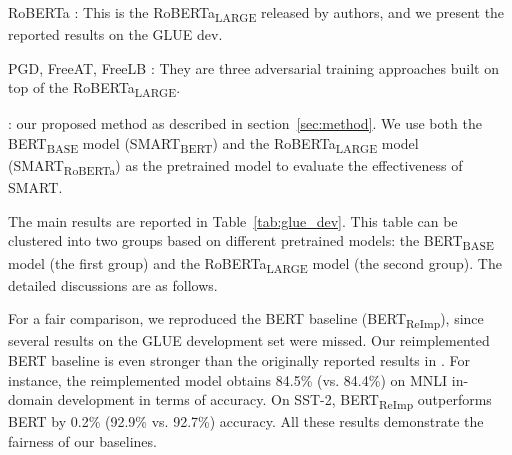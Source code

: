 \documentclass[11pt]{article} \usepackage{url}
\newcommand\model{SMART}
\begin{document}
\vskip1pt
\noindent  RoBERTa \cite{liu2019roberta}: This is the RoBERTa\textsubscript{LARGE} released by authors, and we present the reported results on the GLUE dev. 

\vskip1pt
\noindent  PGD, FreeAT, FreeLB \citep{zhu2019freelb}: They are three adversarial training approaches built on top of the RoBERTa\textsubscript{LARGE}. 







\vskip1pt
\noindent  {\model}: our proposed method as described in section~\ref{sec:method}. We use both the BERT\textsubscript{BASE} model ({\model}\textsubscript{BERT}) and the RoBERTa\textsubscript{LARGE} model ({\model}\textsubscript{RoBERTa}) as the pretrained model to evaluate the effectiveness of {\model}.  

\vskip1pt
The main results are reported in Table~\ref{tab:glue_dev}. This table can be clustered into two groups based on different pretrained models: the BERT\textsubscript{BASE} model (the first group) and the RoBERTa\textsubscript{LARGE} model (the second group). The detailed discussions are as follows.

For a fair comparison, we reproduced the BERT baseline (BERT\textsubscript{ReImp}), since several results on the GLUE development set were missed. Our reimplemented BERT baseline is even stronger than the originally reported results in \citet{devlin2018bert}. For instance, the reimplemented model obtains 84.5\% (vs. 84.4\%) on MNLI in-domain development in terms of accuracy. On SST-2, BERT\textsubscript{ReImp} outperforms BERT by 0.2\% (92.9\% vs. 92.7\%) accuracy. All these results demonstrate the fairness of our baselines.
\end{document}
